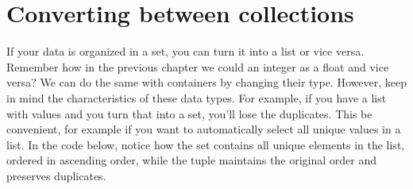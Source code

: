 \documentclass[letterpaper,10pt,english]{jupyterBook}
\begin{document}
\section{Converting between collections}
\label{\detokenize{notebooks/02_Containers/02_Containers_student:converting-between-collections}}
\sphinxAtStartPar
If your data is organized in a set, you can turn it into a list or vice versa. Remember how in the previous chapter we could  an integer as a float and vice versa? We can do the same with containers by changing their type. However, keep in mind the characteristics of these data types. For example, if you have a list with  values and you turn that into a set, you’ll lose the duplicates. This  be convenient, for example if you want to automatically select all unique values in a list. In the code below, notice how the set contains all unique elements in the list, ordered in ascending order, while the tuple maintains the original order and preserves duplicates.
\end{document}
